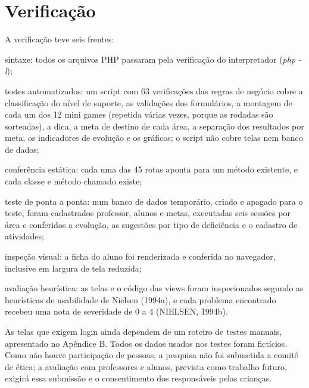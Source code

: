 \section{Verificação}\label{sec:3.4}

A verificação teve seis frentes:

\begin{alineasIFTO}
  \item sintaxe: todos os arquivos PHP passaram pela verificação do interpretador (\textit{php -l});
  \item testes automatizados: um script com 63 verificações das regras de negócio cobre a classificação do nível de suporte, as validações dos formulários, a montagem de cada um dos 12 mini games (repetida várias vezes, porque as rodadas são sorteadas), a dica, a meta de destino de cada área, a separação dos resultados por meta, os indicadores de evolução e os gráficos; o script não cobre telas nem banco de dados;
  \item conferência estática: cada uma das 45 rotas aponta para um método existente, e cada classe e método chamado existe;
  \item teste de ponta a ponta: num banco de dados temporário, criado e apagado para o teste, foram cadastrados professor, alunos e metas, executadas seis sessões por área e conferidos a evolução, as sugestões por tipo de deficiência e o cadastro de atividades;
  \item inspeção visual: a ficha do aluno foi renderizada e conferida no navegador, inclusive em largura de tela reduzida;
  \item avaliação heurística: as telas e o código das views foram inspecionados segundo as heurísticas de usabilidade de Nielsen (1994a), e cada problema encontrado recebeu uma nota de severidade de 0 a 4 (NIELSEN, 1994b).
\end{alineasIFTO}

As telas que exigem login ainda dependem de um roteiro de testes manuais, apresentado no Apêndice B. Todos os dados usados nos testes foram fictícios. Como não houve participação de pessoas, a pesquisa não foi submetida a comitê de ética; a avaliação com professores e alunos, prevista como trabalho futuro, exigirá essa submissão e o consentimento dos responsáveis pelas crianças.

